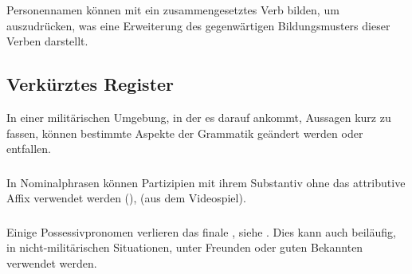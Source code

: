 \subsubsection{}Personennamen können mit  ein zusammengesetztes Verb bilden, um  auszudrücken, was eine Erweiterung des gegenwärtigen Bildungsmusters dieser Verben darstellt.\\

\subsection{Verkürztes Register} In einer militärischen Umgebung, in der es darauf ankommt, Aussagen kurz zu fassen, können bestimmte Aspekte der Grammatik geändert werden oder entfallen.

\subsubsection{} In Nominalphrasen können Partizipien mit ihrem Substantiv ohne das attributive Affix  verwendet werden (),   (aus dem Videospiel).

\subsubsection{} Einige Possessivpronomen verlieren das finale , siehe . Dies kann auch beiläufig, in nicht-militärischen Situationen, unter Freunden oder guten Bekannten verwendet werden.

